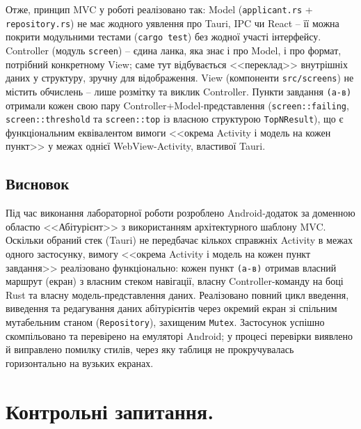 \documentclass[14pt, a4paper]{extreport}
\begin{document}

	Отже, принцип MVC у роботі реалізовано так: Model (\texttt{applicant.rs} + \texttt{repository.rs}) не має жодного уявлення про Tauri, IPC чи React -- її можна покрити модульними тестами (\texttt{cargo test}) без жодної участі інтерфейсу. Controller (модуль \texttt{screen}) -- єдина ланка, яка знає і про Model, і про формат, потрібний конкретному View; саме тут відбувається <<переклад>> внутрішніх даних у структуру, зручну для відображення. View (компоненти \texttt{src/screens}) не містить обчислень -- лише розмітку та виклик Controller. Пункти завдання \texttt{(a-в)} отримали кожен свою пару Controller+Model-представлення (\texttt{screen::failing}, \texttt{screen::threshold} та \texttt{screen::top} із власною структурою \texttt{TopNResult}), що є функціональним еквівалентом вимоги <<окрема Activity і модель на кожен пункт>> у межах однієї WebView-Activity, властивої Tauri.
	

	\subsection*{Висновок}

	Під час виконання лабораторної роботи розроблено Android-додаток за доменною областю <<Абітурієнт>> з використанням архітектурного шаблону MVC. Оскільки обраний стек (Tauri) не передбачає кількох справжніх Activity в межах одного застосунку, вимогу <<окрема Activity і модель на кожен пункт завдання>> реалізовано функціонально: кожен пункт \texttt{(a-в)} отримав власний маршрут (екран) з власним стеком навігації, власну Controller-команду на боці Rust та власну модель-представлення даних. Реалізовано повний цикл введення, виведення та редагування даних абітурієнтів через окремий екран зі спільним мутабельним станом (\texttt{Repository}), захищеним \texttt{Mutex}. Застосунок успішно скомпільовано та перевірено на емуляторі Android; у процесі перевірки виявлено й виправлено помилку стилів, через яку таблиця не прокручувалась горизонтально на вузьких екранах.

	\section*{Контрольні запитання.}
\end{document}
